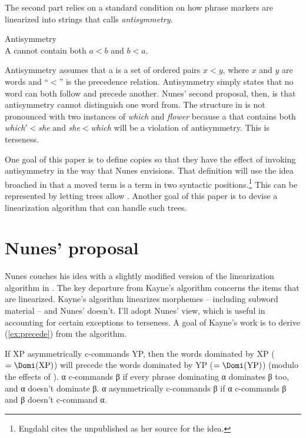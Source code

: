 \documentclass[output=paper]{langsci/langscibook}
\begin{document}
The second part relies on a standard condition on how phrase markers are
linearized into strings that \cite{Kayne1994} calls \emph{antisymmetry}.

\begin{exe}
	\ex \label{ex:antisymm} Antisymmetry\\
	A  cannot contain both $a<b$ and $b<a$.
\end{exe}

Antisymmetry assumes that a  is a set of ordered pairs $x<y$,
where $x$ and $y$ are words and ``$<$'' is the precedence relation. Antisymmetry
simply states that no word can both follow and precede another. Nunes' second
proposal, then, is that antisymmetry cannot distinguish one word from.
The structure in  is not pronounced with two instances of \emph{which} and
\emph{flower} because a  that contains both
\emph{which$'$}$<$\emph{she} and \emph{she}$<$\emph{which} will be a violation of
antisymmetry. This is terseness.\pagebreak

One goal of this paper is to define copies so that they have the effect of
invoking antisymmetry in the way that Nunes envisions. That definition will use
the idea broached in \cite{Engdahl1980} that a moved term is a term in two
syntactic positions.\footnote{Engdahl cites the unpublished \citet{PetRit1981}
as her source for the idea.} This can be represented by letting 
trees allow . Another goal of this paper is to devise a
linearization algorithm that can handle such trees.

\section{Nunes' proposal} %
\label{sec:nunesproposal}

Nunes couches his idea with a slightly modified version of the linearization
algorithm in \cite{Kayne1994}. The key departure from Kayne's algorithm
concerns the items that are linearized. Kayne's algorithm linearizes morphemes
-- including subword material -- and Nunes' doesn't. I'll adopt Nunes' view,
which is useful in accounting for certain exceptions to terseness. A goal of
Kayne's work is to derive (\ref{ex:precede}) from the  algorithm.
\begin{exe}
	\ex \label{ex:precede}
    If XP asymmetrically c-commands YP, then the words dominated by XP ($=\Domi(\text{XP})$)
    will precede the words dominated by YP ($=\Domi(\text{YP})$) (modulo the effects of
    ).
    \ex α c-commands β if every phrase dominating α dominates β too, and α
    doesn't dominate β. α asymmetrically c-commands β if α c-commands β and β
    doesn't c-command α.
\end{exe}
\end{document}
